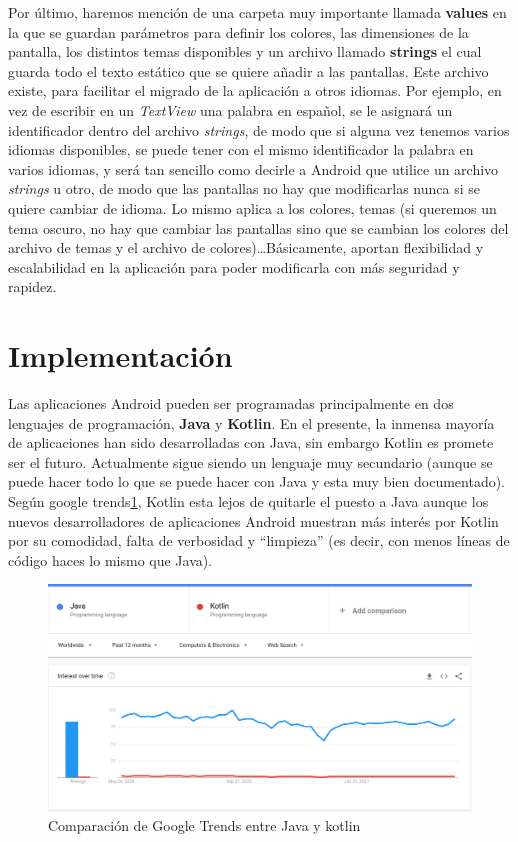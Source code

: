 Por último, haremos mención de una carpeta muy importante llamada \textbf{values} en la que se guardan parámetros para definir los colores, las dimensiones de la pantalla, los distintos temas disponibles y un archivo llamado \textbf{strings} el cual guarda todo el texto estático que se quiere añadir a las pantallas. Este archivo existe, para facilitar el migrado de la aplicación a otros idiomas. Por ejemplo, en vez de escribir en un \textit{TextView} una palabra en español, se le asignará un identificador dentro del archivo \emph{strings}, de modo que si alguna vez tenemos varios idiomas disponibles, se puede tener con el mismo identificador la palabra en varios idiomas, y será tan sencillo como decirle a Android que utilice un archivo \emph{strings} u otro, de modo que las pantallas no hay que modificarlas nunca si se quiere cambiar de idioma. Lo mismo aplica a los colores, temas (si queremos un tema oscuro, no hay que cambiar las pantallas sino que se cambian los colores del archivo de temas y el archivo de colores)\dots Básicamente, aportan flexibilidad y escalabilidad en la aplicación para poder modificarla con más seguridad y rapidez. 





\clearpage
\section{Implementación} \label{sec:Codigo}

Las aplicaciones Android pueden ser programadas principalmente en dos lenguajes de programación, \textbf{Java} y \textbf{Kotlin}. En el presente, la inmensa mayoría de aplicaciones han sido desarrolladas con Java, sin embargo Kotlin es promete ser el futuro. Actualmente sigue siendo un lenguaje muy secundario (aunque se puede hacer todo lo que se puede hacer con Java y esta muy bien documentado). Según google trends\ref{fig:java_vs_kotlin}, Kotlin esta lejos de quitarle el puesto a Java aunque los nuevos desarrolladores de aplicaciones Android muestran más interés por Kotlin por su comodidad, falta de verbosidad y ``limpieza'' (es decir, con menos líneas de código haces lo mismo que Java). 

\begin{figure}[h!]
  \centering
  \includegraphics[width=0.9\linewidth]{figs/Desarrollo/Popularidad}
  \caption[Java vs Kotlin]{Comparación de Google Trends entre Java y kotlin}
  \label{fig:java_vs_kotlin}
\end{figure}


